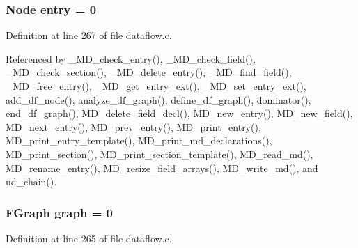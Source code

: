 \subsubsection{\setlength{\rightskip}{0pt plus 5cm}\bf{Node} \bf{entry} = 0\hspace{0.3cm}{\tt  [static]}}\label{dataflow_8c_79617e393ed50f7bffa2de436e1f9c74}




Definition at line 267 of file dataflow.c.

Referenced by \_\-MD\_\-check\_\-entry(), \_\-MD\_\-check\_\-field(), \_\-MD\_\-check\_\-section(), \_\-MD\_\-delete\_\-entry(), \_\-MD\_\-find\_\-field(), \_\-MD\_\-free\_\-entry(), \_\-MD\_\-get\_\-entry\_\-ext(), \_\-MD\_\-set\_\-entry\_\-ext(), add\_\-df\_\-node(), analyze\_\-df\_\-graph(), define\_\-df\_\-graph(), dominator(), end\_\-df\_\-graph(), MD\_\-delete\_\-field\_\-decl(), MD\_\-new\_\-entry(), MD\_\-new\_\-field(), MD\_\-next\_\-entry(), MD\_\-prev\_\-entry(), MD\_\-print\_\-entry(), MD\_\-print\_\-entry\_\-template(), MD\_\-print\_\-md\_\-declarations(), MD\_\-print\_\-section(), MD\_\-print\_\-section\_\-template(), MD\_\-read\_\-md(), MD\_\-rename\_\-entry(), MD\_\-resize\_\-field\_\-arrays(), MD\_\-write\_\-md(), and ud\_\-chain().
\subsubsection{\setlength{\rightskip}{0pt plus 5cm}\bf{FGraph} \bf{graph} = 0\hspace{0.3cm}{\tt  [static]}}\label{dataflow_8c_3e542f70d4117a954b3d7f30956d2b0d}




Definition at line 265 of file dataflow.c.

